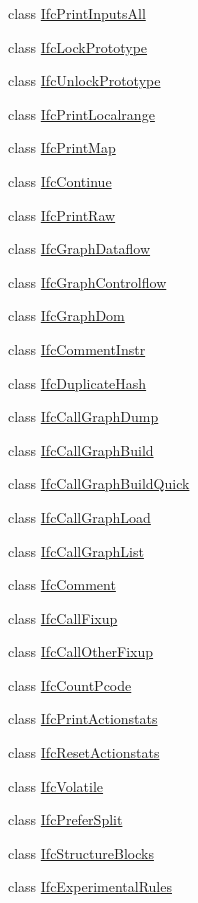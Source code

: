 \begin{DoxyCompactItemize}
\item 
class \mbox{\hyperlink{class_ifc_print_inputs_all}{Ifc\+Print\+Inputs\+All}}
\item 
class \mbox{\hyperlink{class_ifc_lock_prototype}{Ifc\+Lock\+Prototype}}
\item 
class \mbox{\hyperlink{class_ifc_unlock_prototype}{Ifc\+Unlock\+Prototype}}
\item 
class \mbox{\hyperlink{class_ifc_print_localrange}{Ifc\+Print\+Localrange}}
\item 
class \mbox{\hyperlink{class_ifc_print_map}{Ifc\+Print\+Map}}
\item 
class \mbox{\hyperlink{class_ifc_continue}{Ifc\+Continue}}
\item 
class \mbox{\hyperlink{class_ifc_print_raw}{Ifc\+Print\+Raw}}
\item 
class \mbox{\hyperlink{class_ifc_graph_dataflow}{Ifc\+Graph\+Dataflow}}
\item 
class \mbox{\hyperlink{class_ifc_graph_controlflow}{Ifc\+Graph\+Controlflow}}
\item 
class \mbox{\hyperlink{class_ifc_graph_dom}{Ifc\+Graph\+Dom}}
\item 
class \mbox{\hyperlink{class_ifc_comment_instr}{Ifc\+Comment\+Instr}}
\item 
class \mbox{\hyperlink{class_ifc_duplicate_hash}{Ifc\+Duplicate\+Hash}}
\item 
class \mbox{\hyperlink{class_ifc_call_graph_dump}{Ifc\+Call\+Graph\+Dump}}
\item 
class \mbox{\hyperlink{class_ifc_call_graph_build}{Ifc\+Call\+Graph\+Build}}
\item 
class \mbox{\hyperlink{class_ifc_call_graph_build_quick}{Ifc\+Call\+Graph\+Build\+Quick}}
\item 
class \mbox{\hyperlink{class_ifc_call_graph_load}{Ifc\+Call\+Graph\+Load}}
\item 
class \mbox{\hyperlink{class_ifc_call_graph_list}{Ifc\+Call\+Graph\+List}}
\item 
class \mbox{\hyperlink{class_ifc_comment}{Ifc\+Comment}}
\item 
class \mbox{\hyperlink{class_ifc_call_fixup}{Ifc\+Call\+Fixup}}
\item 
class \mbox{\hyperlink{class_ifc_call_other_fixup}{Ifc\+Call\+Other\+Fixup}}
\item 
class \mbox{\hyperlink{class_ifc_count_pcode}{Ifc\+Count\+Pcode}}
\item 
class \mbox{\hyperlink{class_ifc_print_actionstats}{Ifc\+Print\+Actionstats}}
\item 
class \mbox{\hyperlink{class_ifc_reset_actionstats}{Ifc\+Reset\+Actionstats}}
\item 
class \mbox{\hyperlink{class_ifc_volatile}{Ifc\+Volatile}}
\item 
class \mbox{\hyperlink{class_ifc_prefer_split}{Ifc\+Prefer\+Split}}
\item 
class \mbox{\hyperlink{class_ifc_structure_blocks}{Ifc\+Structure\+Blocks}}
\item 
class \mbox{\hyperlink{class_ifc_experimental_rules}{Ifc\+Experimental\+Rules}}
\end{DoxyCompactItemize}
